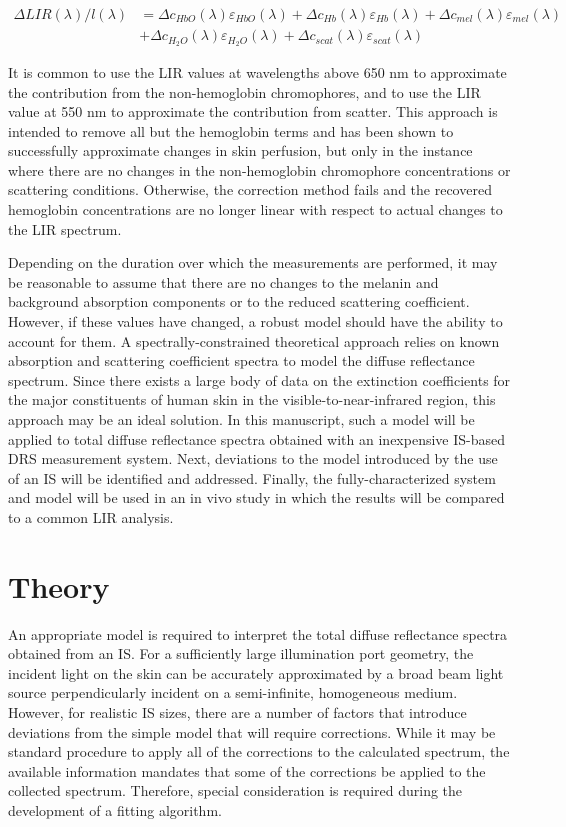 \begin{equation}
	\begin{split}
			\Delta LIR(\lambda)/l(\lambda)  & = \Delta c_{HbO}(\lambda)\varepsilon_{HbO}(\lambda)  + \Delta c_{Hb}(\lambda)\varepsilon_{Hb}(\lambda) + \Delta c_{mel}(\lambda)\varepsilon_{mel}(\lambda) \\
			& + \Delta c_{H_2O}(\lambda)\varepsilon_{H_2O}(\lambda) + \Delta c_{scat}(\lambda)\varepsilon_{scat}(\lambda)
	\end{split}
\end{equation}

It is common to use the LIR values at wavelengths above 650 nm to approximate the contribution from the non-hemoglobin chromophores, and to use the LIR value at 550 nm to approximate the contribution from scatter.\cite{Hajizadeh-Saffar1990} This approach is intended to remove all but the hemoglobin terms and has been shown to successfully approximate changes in skin perfusion, but only in the instance where there are no changes in the non-hemoglobin chromophore concentrations or scattering conditions. Otherwise, the correction method fails and the recovered hemoglobin concentrations are no longer linear with respect to actual changes to the LIR spectrum.

Depending on the duration over which the measurements are performed, it may be reasonable to assume that there are no changes to the melanin and background absorption components or to the reduced scattering coefficient. However, if these values have changed, a robust model should have the ability to account for them. A spectrally-constrained theoretical approach relies on known absorption and scattering coefficient spectra to model the diffuse reflectance spectrum. Since there exists a large body of data on the extinction coefficients for the major constituents of human skin in the visible-to-near-infrared region, this approach may be an ideal solution. In this manuscript, such a model will be applied to total diffuse reflectance spectra obtained with an inexpensive IS-based DRS measurement system. Next, deviations to the model introduced by the use of an IS will be identified and addressed. Finally, the fully-characterized system and model will be used in an in vivo study in which the results will be compared to a common LIR analysis.

\section{Theory}
An appropriate model is required to interpret the total diffuse reflectance spectra obtained from an IS. For a sufficiently large illumination port geometry, the incident light on the skin can be accurately approximated by a broad beam light source perpendicularly incident on a semi-infinite, homogeneous medium. However, for realistic IS sizes, there are a number of factors that introduce deviations from the simple model that will require corrections. While it may be standard procedure to apply all of the corrections to the calculated spectrum, the available information mandates that some of the corrections be applied to the collected spectrum. Therefore, special consideration is required during the development of a fitting algorithm.

